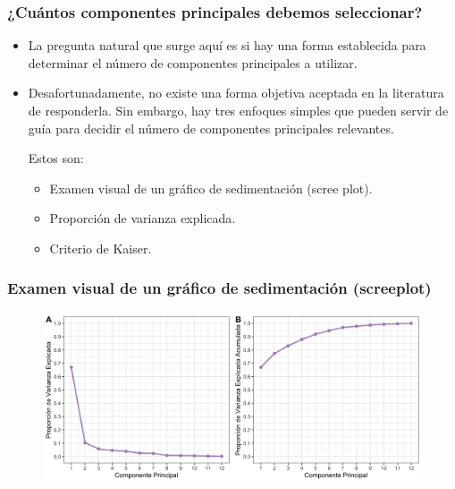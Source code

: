 \documentclass[
  shownotes,
  xcolor={svgnames},
  hyperref={colorlinks,citecolor=DarkBlue,linkcolor=DarkRed,urlcolor=DarkBlue}
  , aspectratio=169]{beamer}
\begin{document}
\begin{frame}
\frametitle{¿Cuántos componentes principales debemos seleccionar?}

\begin{itemize}
 \item La pregunta natural que surge aquí es si hay una forma establecida para determinar el número de componentes principales a utilizar.
 \medskip
 \item  Desafortunadamente, no existe una forma objetiva aceptada en la literatura de responderla. Sin embargo, hay tres enfoques simples que pueden servir de guía para decidir el número de componentes principales relevantes.

Estos son:

  \begin{itemize}

    \item Examen visual de un gráfico de sedimentación (scree plot).
    \item Proporción de varianza explicada.
    \item Criterio de Kaiser.
  \end{itemize}
\end{itemize}

\end{frame}

\begin{frame}
\frametitle{Examen visual de un gráfico de sedimentación (screeplot)}
    


\begin{figure}[H] \centering

    \centering
    \includegraphics[scale=.1]{figures/plot_S1_LSC2_1.png}
  \\
  \tiny
\end{figure}


\end{frame}
\end{document}
